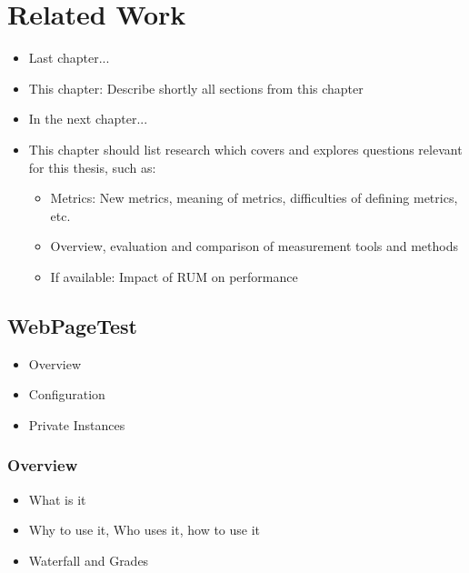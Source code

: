 \chapter{Related Work}

\begin{itemize}
	\item Last chapter...
	\item This chapter: Describe shortly all sections from this chapter
	\item In the next chapter...
\end{itemize}

\begin{itemize}
\item This chapter should list research which covers and explores questions relevant for this thesis, such as:
	\begin{itemize}
	\item Metrics: New metrics, meaning of metrics, difficulties of defining metrics, etc.
	\item Overview, evaluation and comparison of measurement tools and methods
	\item If available: Impact of RUM on performance
	\end{itemize}
\end{itemize}





\section{WebPageTest}

\begin{itemize}
\item Overview
\item Configuration
\item Private Instances
\end{itemize}




\subsection{Overview}

\begin{itemize}
\item What is it
\item Why to use it, Who uses it, how to use it
\item Waterfall and Grades
\end{itemize}


